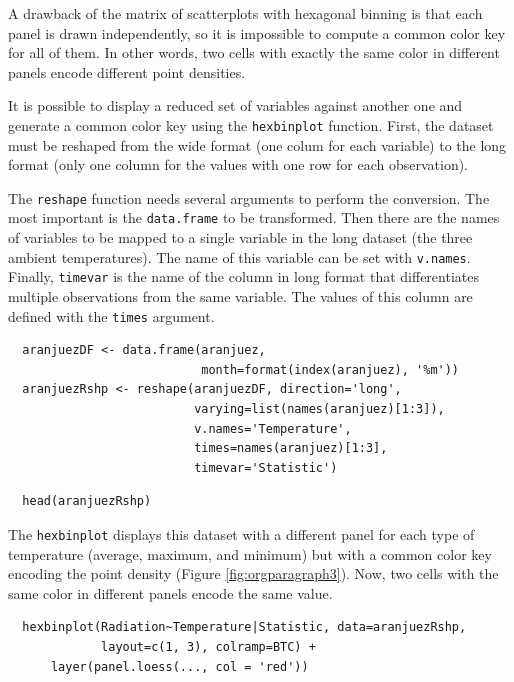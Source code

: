 \documentclass[smallroyalvopaper]{memoir}
\begin{document}
A drawback of the matrix of scatterplots with hexagonal binning is
that each panel is drawn independently, so it is impossible to compute
a common color key for all of them. In other words, two cells with
exactly the same color in different panels encode different point
densities.

It is possible to display a reduced set of variables against
another one and generate a common color key using the \texttt{hexbinplot}
function. First, the dataset must be reshaped from the wide format
(one colum for each variable) to the long format (only one column for
the values with one row for each observation). 

The \texttt{reshape} function needs several arguments to perform the
conversion. The most important is the \texttt{data.frame} to be
transformed. Then there are the names of variables to be mapped to
a single variable in the long dataset (the three ambient
temperatures). The name of this variable can be set with
\texttt{v.names}. Finally, \texttt{timevar} is the name of the column in long format that
differentiates multiple observations from the same variable. The
values of this column are defined with the \texttt{times} argument.


\lstset{language=R,label= ,caption= ,captionpos=b,numbers=none}
\begin{lstlisting}
  aranjuezDF <- data.frame(aranjuez,
                           month=format(index(aranjuez), '%m'))
  aranjuezRshp <- reshape(aranjuezDF, direction='long',
                          varying=list(names(aranjuez)[1:3]),
                          v.names='Temperature',
                          times=names(aranjuez)[1:3],
                          timevar='Statistic')
\end{lstlisting}


\lstset{language=R,label= ,caption= ,captionpos=b,numbers=none}
\begin{lstlisting}
  head(aranjuezRshp)
\end{lstlisting}

The \texttt{hexbinplot} displays this dataset with a different panel for
each type of temperature (average, maximum, and minimum) but with a
common color key encoding the point density (Figure
\ref{fig:orgparagraph3}). Now, two cells with the same color in
different panels encode the same value. 

\lstset{language=R,label= ,caption= ,captionpos=b,numbers=none}
\begin{lstlisting}
  hexbinplot(Radiation~Temperature|Statistic, data=aranjuezRshp,
             layout=c(1, 3), colramp=BTC) +
      layer(panel.loess(..., col = 'red'))
\end{lstlisting}
\end{document}
